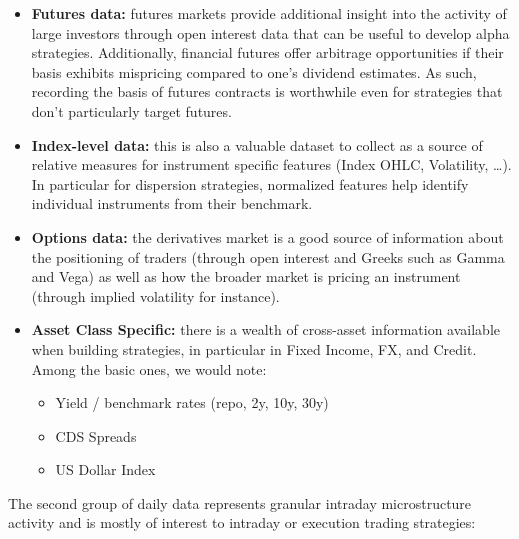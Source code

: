 \begin{itemize}
\item \textbf{Futures data:} futures markets provide additional insight into the activity of large investors through open interest data that can be useful to develop alpha strategies. Additionally, financial futures offer arbitrage opportunities if their basis exhibits mispricing compared to one's dividend estimates. As such, recording the basis of futures contracts is worthwhile even for strategies that don't particularly target futures.
\item \textbf{Index-level data:} this is also a valuable dataset to collect as a source of relative measures for instrument specific features (Index OHLC, Volatility, \dots). In particular for dispersion strategies, normalized features help identify individual instruments from their benchmark. 
\item \textbf{Options data:} the derivatives market is a good source of information about the positioning of traders (through open interest and Greeks such as Gamma and Vega) as well as how the broader market is pricing an instrument (through implied volatility for instance).
\item \textbf{Asset Class Specific:} there is a wealth of cross-asset information available when building strategies, in particular in Fixed Income, FX, and Credit. Among the basic ones, we would note:
\begin{itemize}
\item Yield / benchmark rates (repo, 2y, 10y, 30y)
\item CDS Spreads
\item US Dollar Index
\end{itemize}
\end{itemize}

The second group of daily data represents granular intraday microstructure activity and is mostly of interest to intraday or execution trading strategies:

